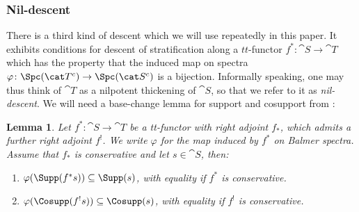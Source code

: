 \documentclass{amsart}%
\numberwithin{equation}{section}%
\newtheorem{Lem}[equation]{Lemma}
\theoremstyle{remark}
\newcounter{enum-resume-hack}
\begin{document}
\subsubsection{Nil-descent}

There is a third kind of descent which we will use repeatedly in this paper. It exhibits conditions for descent of stratification along a  $tt$-functor $f^*\colon \cat S \to \cat T$ which has the property that the induced map on spectra $\varphi\colon \Spc(\cat T^c) \to \Spc(\cat S^c)$ is a bijection. Informally speaking, one may thus think of $\cat T$ as a nilpotent thickening of $\cat S$, so that we refer to it as \emph{nil-descent}. We will need a base-change lemma for support and cosupport from \cite{bchs1}:

\begin{Lem}\label{lem:cosuppbasechange}
Let $f^*\colon \cat S \to \cat T$ be a tt-functor with right adjoint $f_*$, which admits a further right adjoint $f^!$. We write $\varphi$ for the map induced by $f^*$ on Balmer spectra. Assume that $f_*$ is conservative and let $s \in \cat S$, then:
    \begin{enumerate}
        \item $\varphi(\Supp(f^*s)) \subseteq  \Supp(s)$, with equality if $f^*$ is conservative.
        \item $\varphi(\Cosupp(f^!s)) \subseteq  \Cosupp(s)$, with equality if $f^!$ is conservative.
    \end{enumerate}
\end{Lem}
\end{document}
